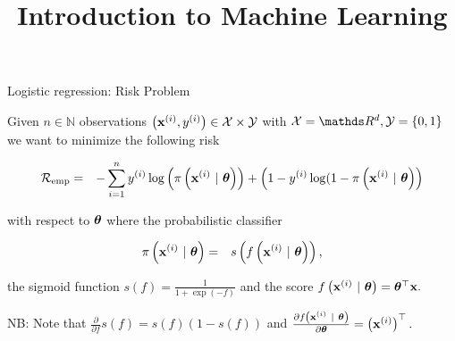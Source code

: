 \documentclass[11pt,compress,t,notes=noshow, xcolor=table]{beamer}
\title{Introduction to Machine Learning}
\institute{\href{https://compstat-lmu.github.io/lecture_i2ml/}{compstat-lmu.github.io/lecture\_i2ml}}
\date{}
\begin{document}


\begin{vbframe}{Logistic regression: Risk Problem}

Given $n \in \mathbb{N}$ observations $\left(\mathbf{x}^{(i)}, y^{(i)}\right) \in \mathcal{X} \times \mathcal{Y}$ with  $\Xspace = \R^d, \Yspace = \{0, 1\}$ we want to minimize the following risk 


\vspace*{-0.5cm}

\begin{eqnarray*}
  \mathcal{R}_{\text{emp}}  & = & 
  -\sum^n_{i=1} y^{(i)}\log\left(\pi\left(\mathbf{x}^{(i)} ~|~ \bm{\theta}\right)\right) + \left(1-y^{(i)}\log(1-\pi\left(\mathbf{x}^{(i)} ~|~ \bm{\theta}\right)\right)
\end{eqnarray*}

with respect to $\bm{\theta}$ where the probabilistic classifier

\begin{eqnarray*}
  \pi\left(\mathbf{x}^{(i)} ~|~ \bm{\theta}\right)  & = & 
 s\left(f\left(\mathbf{x}^{(i)} ~|~ \bm{\theta}\right)\right),
\end{eqnarray*}

the sigmoid function $s(f) = \frac{1}{1 + \exp(-f)}$ and the score $f\left(\mathbf{x}^{(i)} ~|~ \bm{\theta}\right) = \bm{\theta}^\top \mathbf{x}.$

\vspace*{0.5cm} 

NB: Note that $\frac{\partial}{\partial f} s(f) = s(f)(1-s(f))$ and $\frac{\partial f\left(\mathbf{x}^{(i)} ~|~ \bm{\theta}\right)}{\partial \bm{\theta}} = \left(\mathbf{x}^{(i)}\right)^\top.$

\end{vbframe}
\end{document}
